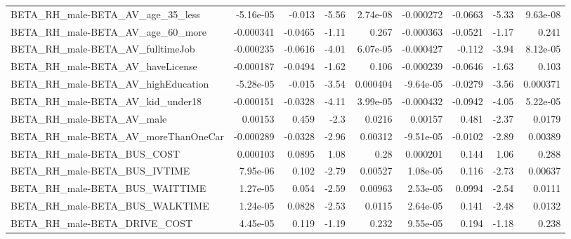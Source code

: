 \begin{tabular}{lrrrrrrrr}
BETA\_RH\_male-BETA\_AV\_age\_35\_less                   &   -5.16e-05 &       -0.013 &     -5.56 & 2.74e-08 &  -0.000272 &     -0.0663 &        -5.33 &      9.63e-08 \\
BETA\_RH\_male-BETA\_AV\_age\_60\_more                   &   -0.000341 &      -0.0465 &     -1.11 &    0.267 &  -0.000363 &     -0.0521 &        -1.17 &         0.241 \\
BETA\_RH\_male-BETA\_AV\_fulltimeJob                   &   -0.000235 &      -0.0616 &     -4.01 & 6.07e-05 &  -0.000427 &      -0.112 &        -3.94 &      8.12e-05 \\
BETA\_RH\_male-BETA\_AV\_haveLicense                   &   -0.000187 &      -0.0494 &     -1.62 &    0.106 &  -0.000239 &     -0.0646 &        -1.63 &         0.103 \\
BETA\_RH\_male-BETA\_AV\_highEducation                 &   -5.28e-05 &       -0.015 &     -3.54 & 0.000404 &  -9.64e-05 &     -0.0279 &        -3.56 &      0.000371 \\
BETA\_RH\_male-BETA\_AV\_kid\_under18                   &   -0.000151 &      -0.0328 &     -4.11 & 3.99e-05 &  -0.000432 &     -0.0942 &        -4.05 &      5.22e-05 \\
BETA\_RH\_male-BETA\_AV\_male                          &     0.00153 &        0.459 &      -2.3 &   0.0216 &    0.00157 &       0.481 &        -2.37 &        0.0179 \\
BETA\_RH\_male-BETA\_AV\_moreThanOneCar                &   -0.000289 &      -0.0328 &     -2.96 &  0.00312 &  -9.51e-05 &     -0.0102 &        -2.89 &       0.00389 \\
BETA\_RH\_male-BETA\_BUS\_COST                         &    0.000103 &       0.0895 &      1.08 &     0.28 &   0.000201 &       0.144 &         1.06 &         0.288 \\
BETA\_RH\_male-BETA\_BUS\_IVTIME                       &    7.95e-06 &        0.102 &     -2.79 &  0.00527 &   1.08e-05 &       0.116 &        -2.73 &       0.00637 \\
BETA\_RH\_male-BETA\_BUS\_WAITTIME                     &    1.27e-05 &        0.054 &     -2.59 &  0.00963 &   2.53e-05 &      0.0994 &        -2.54 &        0.0111 \\
BETA\_RH\_male-BETA\_BUS\_WALKTIME                     &    1.24e-05 &       0.0828 &     -2.53 &   0.0115 &   2.64e-05 &       0.141 &        -2.48 &        0.0132 \\
BETA\_RH\_male-BETA\_DRIVE\_COST                       &    4.45e-05 &        0.119 &     -1.19 &    0.232 &   9.55e-05 &       0.194 &        -1.18 &         0.238 \\

\end{tabular}
